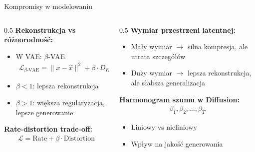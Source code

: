 \documentclass{beamer}
\begin{document}
\begin{frame}{Kompromisy w modelowaniu}
    \begin{columns}
        \begin{column}{0.5\textwidth}
            \textbf{Rekonstrukcja vs różnorodność:}
            \begin{itemize}
                \item W VAE: $\beta$-VAE
                      \begin{align*}
                          \mathcal{L}_{\beta\text{-VAE}} = \|x - \hat{x}\|^2 + \beta \cdot D_{KL}
                      \end{align*}
                \item $\beta < 1$: lepsza rekonstrukcja
                \item $\beta > 1$: większa regularyzacja, lepsze generowanie
            \end{itemize}

            \textbf{Rate-distortion trade-off:}
            \begin{align*}
                \mathcal{L} = \text{Rate} + \beta \cdot \text{Distortion}
            \end{align*}
        \end{column}
        \begin{column}{0.5\textwidth}
            \textbf{Wymiar przestrzeni latentnej:}
            \begin{itemize}
                \item Mały wymiar $\rightarrow$ silna kompresja, ale utrata szczegółów
                \item Duży wymiar $\rightarrow$ lepsza rekonstrukcja, ale słabsza generalizacja
            \end{itemize}

            \textbf{Harmonogram szumu w Diffusion:}
            \begin{align*}
                \beta_1, \beta_2, \ldots, \beta_T
            \end{align*}
            \begin{itemize}
                \item Liniowy vs nieliniowy
                \item Wpływ na jakość generowania
            \end{itemize}
        \end{column}
    \end{columns}
\end{frame}
\end{document}
